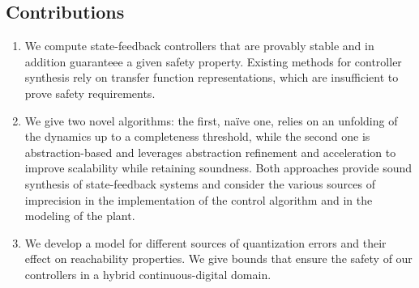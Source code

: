 \documentclass[runningheads,a4paper]{llncs}
\begin{document}


\subsection*{Contributions} 

\begin{enumerate}
%
\item  We compute state-feedback controllers that are provably stable and in
  addition guaranteee a given safety property.  Existing methods for
  controller synthesis rely on transfer function representations, which are
  insufficient to prove safety requirements.
%
\item We give two novel algorithms: the first, na\"ive one, relies on
  an unfolding of the dynamics up to a completeness threshold, while the
  second one is abstraction-based and leverages abstraction refinement and
  acceleration to improve scalability while retaining soundness.  Both
  approaches provide sound synthesis of state-feedback systems and consider
  the various sources of imprecision in the implementation of the control
  algorithm and in the modeling of the plant.
%
\item We develop a model for different sources of quantization errors and
  their effect on reachability properties.  We give bounds that ensure the
  safety of our controllers in a hybrid continuous-digital domain.
%
\end{enumerate}

\end{document}
